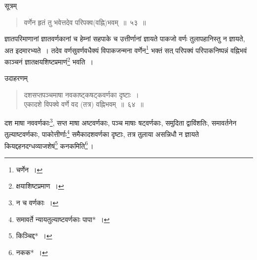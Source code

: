 \documentclass[10pt, openany]{book}
\begin{document}
{{ {सूत्रम्\textemdash}
\vspace{-1mm}

\begin{quote}
    
{\bs वर्णेन हृतं तु भवेत्तदेव परिपक्व(वह्नि)भवम्~॥~५३~॥}\end{quote}
\vspace{-1mm}

{ज्ञातपरिमाणानां ज्ञातवर्णकानां च हेम्नां सहपाके च उत्तीर्णानां ज्ञायते
पाकजो वर्णः}
{तुलापहानिस्तु न ज्ञायते, अत इदमारभ्यते~। तदेव वर्णसुवर्णवधैक्यं
विपाकजन्मना वर्णेन\renewcommand{\thefootnote}{\s ८}\footnote{\s चर्णेन~।} भक्तं}
{सत् परिपक्वं परिपाकनिष्पन्नं वह्निभवं काञ्चनं
ज्ञातक्षयशिष्टप्रमाणं\renewcommand{\thefootnote}{\s ९}\footnote{\s *क्षयाशिष्टप्रमाण~।} भवति~।}
\vspace{1mm}

{उदाहरणम्\textemdash}
\vspace{-1mm}

\begin{quote}
    
{\eg दशसप्तपञ्चमाषा नवकाष्ट्कषट्कवर्णका दृष्टाः~। \\
 एकादशे विपक्वे वर्णे वद (तत्र) वह्निभवम्~॥~६४~॥}\end{quote}
\vspace{-1mm}

{दश माषा नववर्णकाः\renewcommand{\thefootnote}{\s १०}\footnote{\s  न च वर्णकाः~।}, सप्त माषा अष्टवर्णकाः, पञ्च माषाः
षट्वर्णकाः, समुदिता}
{द्वाविंशतिः, समावर्तनेन तुल्याष्टवर्णकाः, पाकोत्तीर्णाः\renewcommand{\thefootnote}{\s ११}\footnote{\s समावर्ते न्यायतुल्याष्टवर्णकाः पापा*~।}
समैकादशवर्णका दृष्टाः, तत्र तुलाया}
{असन्निधौ न ज्ञायते कियद्दहनदग्धव्याजशेषं\renewcommand{\thefootnote}{\s १२}\footnote{\s किञ्चिद्द*~।} कनकमिति\renewcommand{\thefootnote}{\s १३}\footnote{\s नकक*~।}\,।}


\newpage

}}
\end{document}
